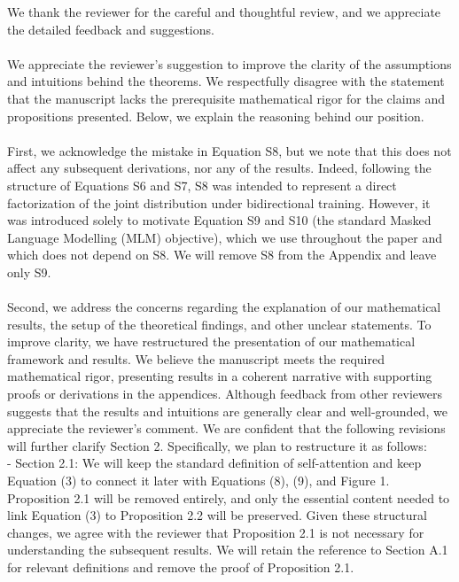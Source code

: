 \documentclass[11pt]{article}
\begin{document}
We thank the reviewer for the careful and thoughtful review, and we appreciate the detailed feedback and suggestions. 
%
\\\\
%
We appreciate the reviewer’s suggestion to improve the clarity of the assumptions and intuitions behind the theorems.
%
We respectfully disagree with the statement that the manuscript lacks the prerequisite mathematical rigor for the claims and propositions presented. Below, we explain the reasoning behind our position.
%
\\\\
%
First, we acknowledge the mistake in Equation S8, but we note that this does not affect any subsequent derivations, nor any of the results. Indeed, following the structure of Equations S6 and S7, S8 was intended to represent a direct factorization of the joint distribution under bidirectional training. However, it was introduced solely to motivate Equation S9 and S10 (the standard Masked Language Modelling (MLM) objective), which we use throughout the paper and which does not depend on S8. We will remove S8 from the Appendix and leave only S9.
%
\\\\
%
Second, we address the concerns regarding the explanation of our mathematical results, the setup of the theoretical findings, and other unclear statements.
To improve clarity, we have restructured the presentation of our mathematical framework and results. 
We believe the manuscript meets the required mathematical rigor, presenting results in a coherent narrative with supporting proofs or derivations in the appendices. 
Although feedback from other reviewers suggests that the results and intuitions are generally clear and well-grounded, we appreciate the reviewer’s comment. We are confident that the following revisions will further clarify Section 2. Specifically, we plan to restructure it as follows:
%
\\
- Section 2.1: We will keep the standard definition of self-attention and keep Equation (3) to connect it later with Equations (8), (9), and Figure 1. Proposition 2.1 will be removed entirely, and only the essential content needed to link Equation (3) to Proposition 2.2 will be preserved. Given these structural changes, we agree with the reviewer that Proposition 2.1 is not necessary for understanding the subsequent results. We will retain the reference to Section A.1 for relevant definitions and remove the proof of Proposition 2.1.
%
\\
%
\end{document}
